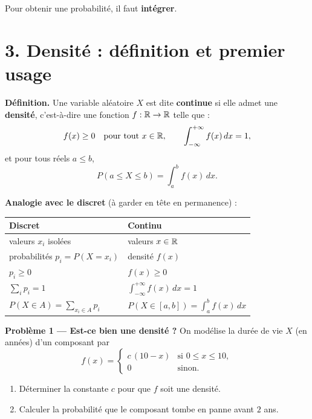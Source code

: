 
Pour obtenir une probabilité, il faut \textbf{intégrer}.

\section*{3. Densité : définition et premier usage}

\begin{mdframed}[backgroundcolor=ThemeLight, linecolor=Theme,
  linewidth=1pt, innertopmargin=8pt, innerbottommargin=8pt, nobreak=true]
\textbf{Définition.}
Une variable aléatoire $X$ est dite \textbf{continue}
si elle admet une \textbf{densité}, c'est-à-dire une fonction
$f:\mathbb{R}\to\mathbb{R}$ telle que :
\[
  f(x)\ge 0 \quad\text{pour tout } x\in\mathbb{R},
  \qquad
  \int_{-\infty}^{+\infty} f(x)\,dx = 1,
\]
et pour tous réels $a\le b$,
\[
  \boxed{\,P(a\le X\le b)=\int_a^b f(x)\,dx.\,}
\]
\end{mdframed}

\textbf{Analogie avec le discret} (à garder en tête en permanence) :

\begin{center}
\renewcommand{\arraystretch}{1.5}
\begin{tabular}{|l|l|}
  \hline
  \textbf{Discret} & \textbf{Continu} \\
  \hline
  valeurs $x_i$ isolées & valeurs $x\in\mathbb{R}$ \\
  probabilités $p_i=P(X=x_i)$ & densité $f(x)$ \\
  $p_i\ge 0$ & $f(x)\ge 0$ \\
  $\displaystyle\sum_i p_i=1$ & $\displaystyle\int_{-\infty}^{+\infty} f(x)\,dx=1$ \\
  $\displaystyle P(X\in A)=\sum_{x_i\in A} p_i$
    & $\displaystyle P(X\in[a,b])=\int_a^b f(x)\,dx$ \\
  \hline
\end{tabular}
\end{center}

\medskip

\textbf{Problème 1 --- Est-ce bien une densité ?}
On modélise la durée de vie $X$ (en années) d'un composant par
\[
  f(x)=
  \begin{cases}
    c\,(10-x) & \text{si } 0\le x\le 10,\\
    0 & \text{sinon.}
  \end{cases}
\]
\begin{enumerate}
  \item Déterminer la constante $c$ pour que $f$ soit une densité.
  \item Calculer la probabilité que le composant tombe en panne
  avant $2$ ans.
\end{enumerate}

